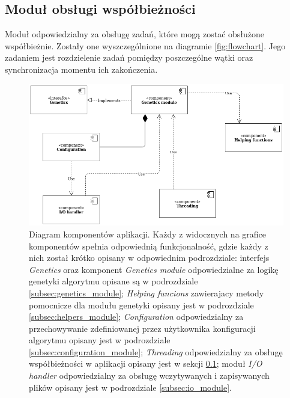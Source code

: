 \subsection{Moduł obsługi współbieżności}
\label{subsec:threading_module}
Moduł odpowiedzialny za obsługę zadań, które mogą zostać obsłużone współbieżnie. Zostały one wyszczególnione na diagramie \ref{fig:flowchart}. Jego zadaniem jest rozdzielenie zadań pomiędzy poszczególne wątki oraz synchronizacja momentu ich zakończenia.

\begin{figure}
    \centering
    \includegraphics[scale=0.5]{images/other/components.png}
    \caption{Diagram komponentów aplikacji. Każdy z widocznych na grafice komponentów spełnia odpowiednią funkcjonalność, gdzie każdy z nich został krótko opisany w odpowiednim podrozdziale: interfejs \textit{Genetics} oraz komponent \textit{Genetics module} odpowiedzialne za logikę genetyki algorytmu opisane są w podrozdziale \ref{subsec:genetics_module}; \textit{Helping funcions} zawierajacy metody pomocnicze dla modułu genetyki opisany jest w podrozdziale \ref{subsec:helpers_module}; \textit{Configuration} odpowiedzialny za przechowywanie zdefiniowanej przez użytkownika konfiguracji algorytmu opisany jest w podrozdziale \ref{subsec:configuration_module}; \textit{Threading} odpowiedzialny za obsługę współbieżności w aplikacji opisany jest w sekcji \ref{subsec:threading_module}; moduł \textit{I/O handler} odpowiedzialny za obsługę wczytywanych i zapisywanych plików opisany jest w podrozdziale \ref{subsec:io_module}.
    }
    \label{fig:components_chart}
\end{figure}
